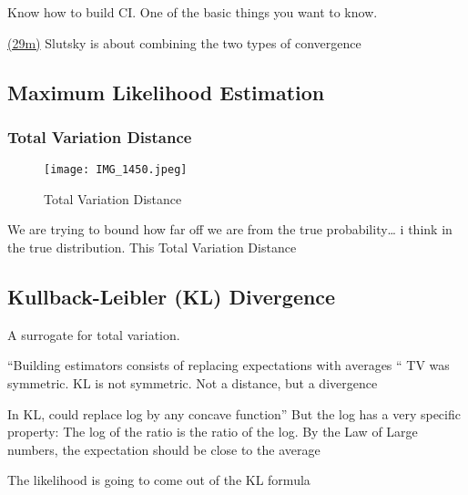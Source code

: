 Know how to build CI. One of the basic things you want to know.

\href{https://youtu.be/rLlZpnT02ZU?t=29m}{(29m)} Slutsky is about combining the two types of convergence

\subsection{Maximum Likelihood Estimation}


\subsubsection{Total Variation Distance}

\begin{figure}[ht]
\centering
\texttt{[image: IMG\_1450.jpeg]}
\caption{Total Variation Distance}
\end{figure}

 We are trying to bound how far off we are from the true probability… i think in the true distribution. This Total Variation Distance


\subsection{Kullback-Leibler (KL) Divergence}


A surrogate for total variation.

 “Building estimators consists of replacing expectations with averages “
TV was symmetric. KL is not symmetric. Not a distance, but a divergence

 In KL, could replace log by any concave function”
But the log has a very specific property: The log of the ratio is the ratio of the log.
By the Law of Large numbers, the expectation should be close to the average

 The likelihood is going to come out of the KL formula

